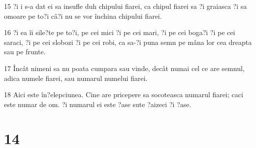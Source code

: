 \par 15 ?i i s-a dat ei sa insufle duh chipului fiarei, ca chipul fiarei sa ?i graiasca ?i sa omoare pe to?i câ?i nu se vor închina chipului fiarei.
\par 16 ?i ea îi sile?te pe to?i, pe cei mici ?i pe cei mari, ?i pe cei boga?i ?i pe cei saraci, ?i pe cei slobozi ?i pe cei robi, ca sa-?i puna semn pe mâna lor cea dreapta sau pe frunte.
\par 17 Încât nimeni sa nu poata cumpara sau vinde, decât numai cel ce are semnul, adica numele fiarei, sau numarul numelui fiarei.
\par 18 Aici este în?elepciunea. Cine are pricepere sa socoteasca numarul fiarei; caci este numar de om. ?i numarul ei este ?ase sute ?aizeci ?i ?ase.

\chapter{14}


